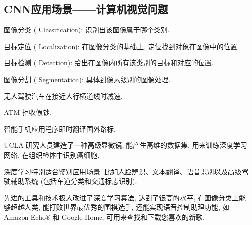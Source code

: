 \subsection{CNN应用场景——计算机视觉问题}

\qquad{} 图像分类 ( Classification): 识别出该图像属于哪个类别.

\qquad{} 目标定位 ( Localization): 在图像分类的基础上,  定位找到对象在图像中的位置.

\qquad{} 目标检测 ( Detection): 给出在图像内所有该类别的目标和对应的位置.

\qquad{} 图像分割 ( Segmentation): 具体到像素级别的图像处理.

\qquad{} 无人驾驶汽车在接近人行横道线时减速.

\qquad{} ATM 拒收假钞.

\qquad{} 智能手机应用程序即时翻译国外路标.

\qquad{} UCLA 研究人员建造了一种高级显微镜, 能产生高维的数据集, 用来训练深度学习网络, 在组织检体中识别癌细胞.

深度学习特别适合鉴别应用场景, 比如人脸辨识、文本翻译、语音识别以及高级驾驶辅助系统 (包括车道分类和交通标志识别).

先进的工具和技术极大改进了深度学习算法, 达到了很高的水平, 在图像分类上能够超越人类, 能打败世界最优秀的围棋选手, 还能实现语音控制助理功能, 如 Amazon Echo® 和 Google Home, 可用来查找和下载您喜欢的新歌.

